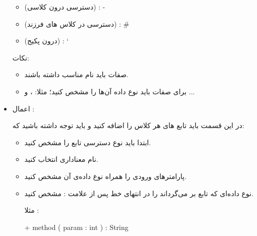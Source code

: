 \documentclass[]{article}
\begin{document}
\begin{itemize}[label=\textcolor{listColor}{$\blacklozenge$}]
\begin{itemize}[label={\textbullet}]
\item
{} (دسترسی درون کلاسی) :    -

\item
{} (دسترسی در کلاس های فرزند) :    \#

\item
{} (درون پکیج) :    \char`~



\end{itemize}

نکات:

\begin{itemize}[label={\textbullet}]

\item
صفات باید نام مناسب داشته باشند.

\item
برای صفات باید نوع داده آن‌ها را مشخص کنید؛ مثلا:  ، و ...


\end{itemize}
   
   \item
   {\fehrest \textcolor{listColor}{اعمال :}}
   
   
   در این قسمت باید تابع های هر کلاس  را اضافه کنید و باید توجه داشته باشید که:
   
\begin{itemize}[label={\textbullet}]

\item
ابتدا باید نوع دسترسی تابع را مشخص کنید.

\item
نام معناداری انتخاب کنید.

\item
پارامتر‌های ورودی را همراه نوع داده‌ی آن مشخص کنید.

\item
نوع داده‌ای که تابع بر می‌گرداند  را  در انتهای خط پس از \linebreak علامت : مشخص کنید.

مثلا :

\begin{center}
\begin{latin}
+ method ( param : int ) : String

\end{latin}
\end{center}



\end{itemize}   


\begin{center}



\end{center}
\end{itemize}
\end{document}
